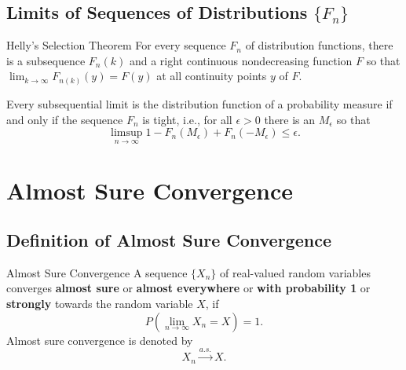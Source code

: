 \subsection{Limits of Sequences of Distributions $\{F_n\}$}

\begin{theorem}{Helly's Selection Theorem}{}
    For every sequence $F_{n}$ of distribution functions, there is a subsequence $F_{n}(k)$ and a right continuous nondecreasing function $F$ so that $\lim_{k\rightarrow\infty}F_{n(k)}(y)=F(y)$ at all continuity points $y$ of $F$.
\end{theorem}

\begin{theorem}{}{}
    Every subsequential limit is the distribution function of a probability measure if and only if the sequence $F_{n}$ is tight, i.e., for all $\epsilon>0$ there is an $M_{\epsilon}$ so that
    \begin{equation}
        \limsup_{n\rightarrow\infty}1-F_{n}\left(M_{\epsilon}\right)+F_{n}\left(-M_{\epsilon}\right)\leq\epsilon.
    \end{equation}
\end{theorem}

\section{Almost Sure Convergence}

\subsection{Definition of Almost Sure Convergence}

\begin{definition}{Almost Sure Convergence}{}
    A sequence $\{X_n\}$ of real-valued random variables converges \textbf{almost sure} or \textbf{almost everywhere} or \textbf{with probability 1} or \textbf{strongly} towards the random variable $X$, if
    \begin{equation}
        P\left(\lim_{n\to\infty}X_n=X\right)=1.
    \end{equation}
    Almost sure convergence is denoted by
    \begin{equation}
        X_n \stackrel{a.s.}{\rightarrow} X.
    \end{equation}
\end{definition}

\begin{note}
    
\end{note}

